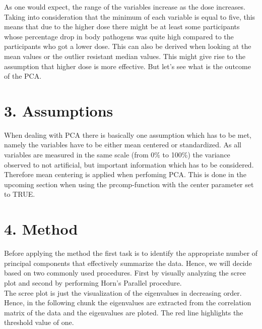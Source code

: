 \documentclass[]{article}
\newenvironment{Shaded}{\begin{snugshade}}{\end{snugshade}}
\newcommand{\KeywordTok}[1]{\textcolor[rgb]{0.13,0.29,0.53}{\textbf{#1}}}
\newcommand{\DataTypeTok}[1]{\textcolor[rgb]{0.13,0.29,0.53}{#1}}
\newcommand{\DecValTok}[1]{\textcolor[rgb]{0.00,0.00,0.81}{#1}}
\newcommand{\StringTok}[1]{\textcolor[rgb]{0.31,0.60,0.02}{#1}}
\newcommand{\CommentTok}[1]{\textcolor[rgb]{0.56,0.35,0.01}{\textit{#1}}}
\newcommand{\OperatorTok}[1]{\textcolor[rgb]{0.81,0.36,0.00}{\textbf{#1}}}
\newcommand{\NormalTok}[1]{#1}
\begin{document}
As one would expect, the range of the variables increase as the dose
increases. Taking into consideration that the minimum of each variable
is equal to five, this means that due to the higher dose there might be
at least some participants whose percentage drop in body pathogens was
quite high compared to the participants who got a lower dose. This can
also be derived when looking at the mean values or the outlier resistant
median values. This might give rise to the assumption that higher dose
is more effective. But let's see what is the outcome of the PCA.

\section{3. Assumptions}

When dealing with PCA there is basically one assumption which has to be
met, namely the variables have to be either mean centered or
standardized. As all variables are measured in the same scale (from 0\%
to 100\%) the variance observed to not artificial, but important
information which has to be considered. Therefore mean centering is
applied when perfoming PCA. This is done in the upcoming section when
using the prcomp-function with the center parameter set to TRUE.

\section{4. Method}

Before applying the method the first task is to identify the appropriate
number of principal components that effectively summarize the data.
Hence, we will decide based on two commonly used procedures. First by
visually analyzing the scree plot and second by performing Horn's
Parallel procedure.\\
The scree plot is just the visualization of the eigenvalues in
decreasing order. Hence, in the following chunk the eigenvalues are
extracted from the correlation matrix of the data and the eigenvalues
are ploted. The red line highlights the threshold value of one.

\begin{Shaded}
\end{Shaded}
\end{document}
